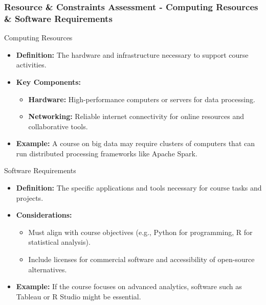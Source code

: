 \documentclass[aspectratio=169]{beamer}
\begin{document}
\begin{frame}[fragile]
    \frametitle{Resource \& Constraints Assessment - Computing Resources \& Software Requirements}
    \begin{block}{Computing Resources}
        \begin{itemize}
            \item \textbf{Definition:} The hardware and infrastructure necessary to support course activities.
            \item \textbf{Key Components:}
            \begin{itemize}
                \item \textbf{Hardware:} High-performance computers or servers for data processing.
                \item \textbf{Networking:} Reliable internet connectivity for online resources and collaborative tools.
            \end{itemize}
            \item \textbf{Example:} A course on big data may require clusters of computers that can run distributed processing frameworks like Apache Spark.
        \end{itemize}
    \end{block}
    
    \begin{block}{Software Requirements}
        \begin{itemize}
            \item \textbf{Definition:} The specific applications and tools necessary for course tasks and projects.
            \item \textbf{Considerations:}
            \begin{itemize}
                \item Must align with course objectives (e.g., Python for programming, R for statistical analysis).
                \item Include licenses for commercial software and accessibility of open-source alternatives.
            \end{itemize}
            \item \textbf{Example:} If the course focuses on advanced analytics, software such as Tableau or R Studio might be essential.
        \end{itemize}
    \end{block}
\end{frame}
\end{document}
